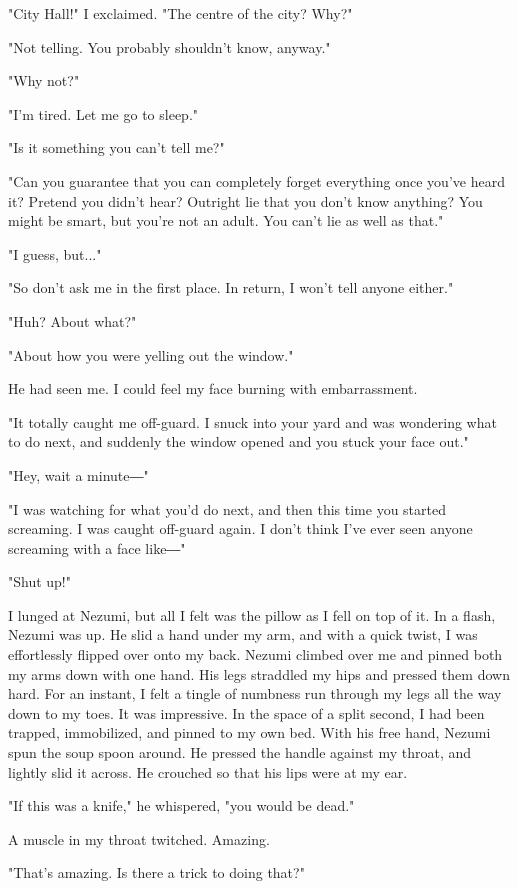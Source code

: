 "City Hall!" I exclaimed. "The centre of the city? Why?"

"Not telling. You probably shouldn't know, anyway."

"Why not?"

"I'm tired. Let me go to sleep."

"Is it something you can't tell me?"

"Can you guarantee that you can completely forget everything once you've
heard it? Pretend you didn't hear? Outright lie that you don't know
anything? You might be smart, but you're not an adult. You can't lie as
well as that."

"I guess, but..."

"So don't ask me in the first place. In return, I won't tell anyone
either."

"Huh? About what?"

"About how you were yelling out the window."

He had seen me. I could feel my face burning with embarrassment.

"It totally caught me off-guard. I snuck into your yard and was
wondering what to do next, and suddenly the window opened and you stuck
your face out."

"Hey, wait a minute―"

"I was watching for what you'd do next, and then this time you started
screaming. I was caught off-guard again. I don't think I've ever seen
anyone screaming with a face like―"

"Shut up!"

I lunged at Nezumi, but all I felt was the pillow as I fell on top of
it. In a flash, Nezumi was up. He slid a hand under my arm, and with a
quick twist, I was effortlessly flipped over onto my back. Nezumi
climbed over me and pinned both my arms down with one hand. His legs
straddled my hips and pressed them down hard. For an instant, I felt a
tingle of numbness run through my legs all the way down to my toes. It
was impressive. In the space of a split second, I had been trapped,
immobilized, and pinned to my own bed. With his free hand, Nezumi spun
the soup spoon around. He pressed the handle against my throat, and
lightly slid it across. He crouched so that his lips were at my ear.

"If this was a knife," he whispered, "you would be dead."

A muscle in my throat twitched. Amazing.

"That's amazing. Is there a trick to doing that?"

